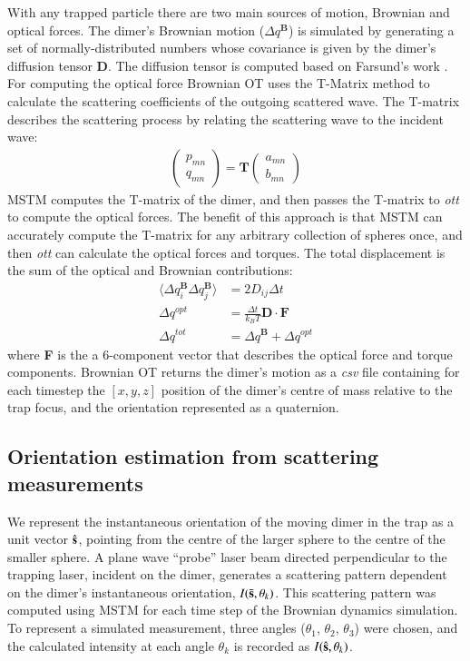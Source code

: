 \documentclass[final, 3p]{elsarticle}
\begin{document}
With any trapped particle there are two main sources of motion,
Brownian and optical forces.  The dimer's Brownian motion
($\Delta q^{\textbf{B}}$) is simulated by generating a set of
normally-distributed numbers whose covariance is given by the dimer's
diffusion tensor $\textbf{D}$.  The diffusion tensor is computed based
on Farsund's work \cite{Farsund1996}. For computing the optical force
Brownian OT uses the T-Matrix method to calculate the scattering
coefficients of the outgoing scattered wave.  The T-matrix describes
the scattering process by relating the scattering wave to the incident
wave:
\begin{align}
	\begin{pmatrix}
		p_{mn} \\
		q_{mn}
	\end{pmatrix}
	= \textbf{T}
	\begin{pmatrix}
		a_{mn} \\
		b_{mn}
	\end{pmatrix}
\end{align}
MSTM computes the T-matrix of the dimer, and then passes the T-matrix
to \textit{ott} to compute the optical forces. The benefit of this
approach is that MSTM can accurately compute the T-matrix for any
arbitrary collection of spheres once, and then \textit{ott} can
calculate the optical forces and torques. The total displacement is
the sum of the optical and Brownian contributions:
\begin{align}
  \langle \Delta q_i^{\textbf{B}} \Delta q_j^{\textbf{B}}\rangle
  &= 2D_{ij} \Delta t
  \\
  \Delta q^{opt} &= \frac{\Delta t}{k_BT}\textbf{D} \cdot \textbf{F}
  \\
\Delta q^{tot} &= \Delta q^{\textbf{B}} + \Delta q^{opt}
\end{align}
where \textbf{F} is the a 6-component vector that describes the
optical force and torque components.  Brownian OT returns the dimer's
motion as a \textit{csv} file containing for each timestep the
$[x,y,z]$ position of the dimer's centre of mass relative to the trap
focus, and the orientation represented as a quaternion.


\subsection{Orientation estimation from scattering measurements}
\label{sec:2.2}

We represent the instantaneous orientation of the moving dimer in the
trap as a unit vector $\hat{\bf s}$, pointing from the centre of the
larger sphere to the centre of the smaller sphere.  A plane wave
``probe'' laser beam directed perpendicular to the trapping laser,
incident on the dimer, generates a scattering pattern dependent on the
dimer's instantaneous orientation, $I(\bar{\bf s},\theta_k)$.  This
scattering pattern was computed using MSTM for each time step of the
Brownian dynamics simulation.  To represent a simulated measurement,
three angles ($\theta_1$, $\theta_2$, $\theta_3$) were chosen, and the
calculated intensity at each angle $\theta_k$ is recorded as
$I(\hat{\bf s}, \theta_k)$.
\end{document}
